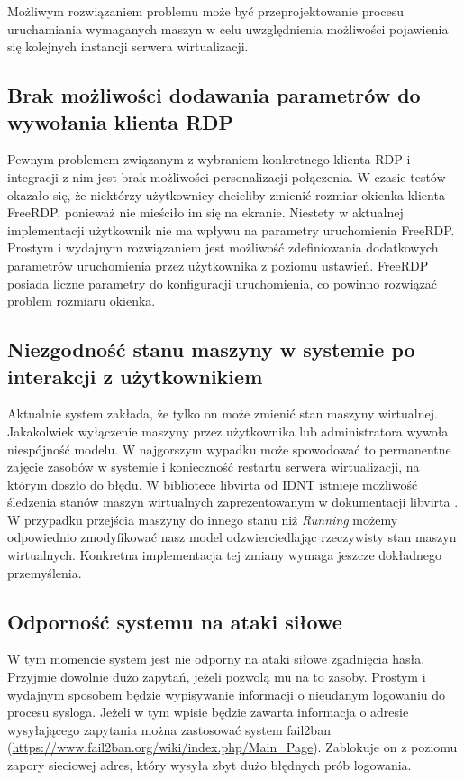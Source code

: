 \documentclass[../podsumowanie.tex]{subfiles}
\begin{document}
Możliwym rozwiązaniem problemu może być przeprojektowanie procesu uruchamiania wymaganych maszyn w celu uwzględnienia możliwości pojawienia się kolejnych instancji serwera wirtualizacji.

\subsection{Brak możliwości dodawania parametrów do wywołania klienta RDP}

Pewnym problemem związanym z wybraniem konkretnego klienta RDP i integracji z nim jest brak możliwości personalizacji połączenia.
W czasie testów okazało się, że niektórzy użytkownicy chcieliby zmienić rozmiar okienka klienta FreeRDP, ponieważ nie mieściło im się na ekranie.
Niestety w aktualnej implementacji użytkownik nie ma wpływu na parametry uruchomienia FreeRDP.
Prostym i wydajnym rozwiązaniem jest możliwość zdefiniowania dodatkowych parametrów uruchomienia przez użytkownika z poziomu ustawień.
FreeRDP posiada liczne parametry do konfiguracji \parencite{freerdp-manual} uruchomienia, co powinno rozwiązać problem rozmiaru okienka.

\subsection{Niezgodność stanu maszyny w systemie po interakcji z użytkownikiem}

Aktualnie system zakłada, że tylko on może zmienić stan maszyny wirtualnej.
Jakakolwiek wyłączenie maszyny przez użytkownika lub administratora wywoła niespójność modelu.
W najgorszym wypadku może spowodować to permanentne zajęcie zasobów w systemie i konieczność restartu serwera wirtualizacji, na którym doszło do błędu.
W bibliotece libvirta od IDNT istnieje możliwość śledzenia stanów maszyn wirtualnych zaprezentowanym w dokumentacji libvirta \parencite{libvirt-vm-states}.
W przypadku przejścia maszyny do innego stanu niż \textit{Running} możemy odpowiednio zmodyfikować nasz model odzwierciedlając rzeczywisty stan maszyn wirtualnych.
Konkretna implementacja tej zmiany wymaga jeszcze dokładnego przemyślenia.

\subsection{Odporność systemu na ataki siłowe}

W tym momencie system jest nie odporny na ataki siłowe zgadnięcia hasła.
Przyjmie dowolnie dużo zapytań, jeżeli pozwolą mu na to zasoby.
Prostym i wydajnym sposobem będzie wypisywanie informacji o nieudanym logowaniu do procesu sysloga.
Jeżeli w tym wpisie będzie zawarta informacja o adresie wysyłającego zapytania można zastosować system fail2ban (\url{https://www.fail2ban.org/wiki/index.php/Main_Page}).
Zablokuje on z poziomu zapory sieciowej adres, który wysyła zbyt dużo błędnych prób logowania.
\end{document}
